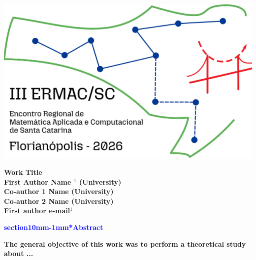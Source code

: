 \documentclass[a0,portrait]{a0poster}
\makeatletter
\renewcommand{\LARGE}{\fontsize{50}{70}\selectfont\bfseries} %
\renewcommand{\large}{\fontsize{40}{50}\selectfont\bfseries}
\renewcommand{\huge}{\fontsize{70}{80}\selectfont\bfseries} %
\renewcommand{\section}{\@startsection%
  {section}{1}{0mm}{-\baselineskip}{1mm}{\LARGE\color{myred}\bfseries}}
\makeatother
\begin{document}
\parbox{0.2\textwidth}{
\includegraphics[scale=0.7]{ermac-logo-texto.pdf}}

\parbox{0.5\textwidth}{
\begin{center}
\textrm{{\huge {\color{myblue} \textbf{
			Work Title}}}\\[1ex]
\bigskip
{\LARGE First Author Name $^1$ (University)}\\[1ex]
{\LARGE Co-author 1 Name (University)\\ 
	\vspace{0.2cm} Co-author 2  Name (University)}\\[1ex]
{\large First author e-mail$^1$}}\\[1ex]
\end{center}}
\parbox{0.3\textwidth}{\vspace{-10cm}
\begin{center}
\large
 \textcolor{blue}{\section*{Abstract}}
 \end{center}
  \large
The general objective of this work was to perform a theoretical study about ...}
\end{document}
